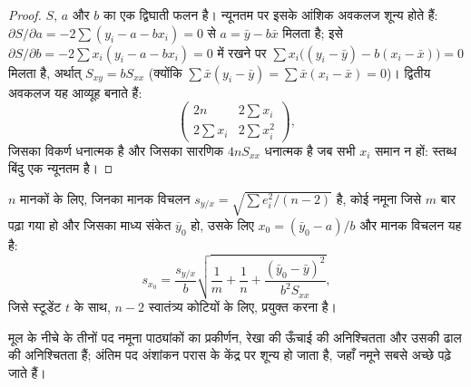 \begin{proof}
$S$, $a$ और $b$ का एक द्विघाती फलन है। न्यूनतम पर इसके आंशिक अवकलज शून्य होते हैं:
$\partial S/\partial a = -2\sum(y_i - a - bx_i) = 0$ से $a = \bar y - b\bar x$ मिलता है; इसे
$\partial S/\partial b = -2\sum x_i(y_i - a - bx_i) = 0$ में रखने पर $\sum x_i\bigl((y_i - \bar y) - b(x_i -
\bar x)\bigr) = 0$ मिलता है, अर्थात् $S_{xy} = bS_{xx}$ (क्योंकि $\sum \bar x(y_i - \bar y) = \sum \bar x(x_i - \bar
x) = 0$)। द्वितीय अवकलज यह आव्यूह बनाते हैं:
\[\begin{pmatrix} 2n & 2\sum x_i\\ 2\sum x_i & 2\sum x_i^2\end{pmatrix},\]
जिसका विकर्ण धनात्मक है और जिसका सारणिक $4nS_{xx}$ धनात्मक है जब सभी $x_i$
समान न हों: स्तब्ध बिंदु एक न्यूनतम है।
\end{proof}

\begin{proposition}[सांद्रता पढ़ना]\label{prop:b2:measurement-statistics:interpolation}
$n$ मानकों के लिए, जिनका  मानक विचलन $s_{y/x} = \sqrt{\sum e_i^2/(n-2)}$ है, कोई नमूना जिसे
$m$ बार पढ़ा गया हो और जिसका माध्य संकेत $\bar y_0$ हो, उसके लिए $x_0 = (\bar y_0 - a)/b$ और मानक विचलन यह है:
\begin{equation*}
s_{x_0} = \frac{s_{y/x}}{b}\sqrt{\frac1m + \frac1n + \frac{(\bar y_0 - \bar y)^2}{b^2S_{xx}}},
\end{equation*}
जिसे स्टूडेंट $t$ के साथ, $n - 2$ स्वातंत्र्य कोटियों के लिए, प्रयुक्त करना है।
\end{proposition}

\admitted

मूल के नीचे के तीनों पद नमूना पाठ्यांकों का प्रकीर्णन, रेखा की ऊँचाई की अनिश्चितता और
उसकी ढाल की अनिश्चितता हैं; अंतिम पद अंशांकन परास के केंद्र पर शून्य हो जाता है, जहाँ
नमूने सबसे अच्छे पढ़े जाते हैं।

